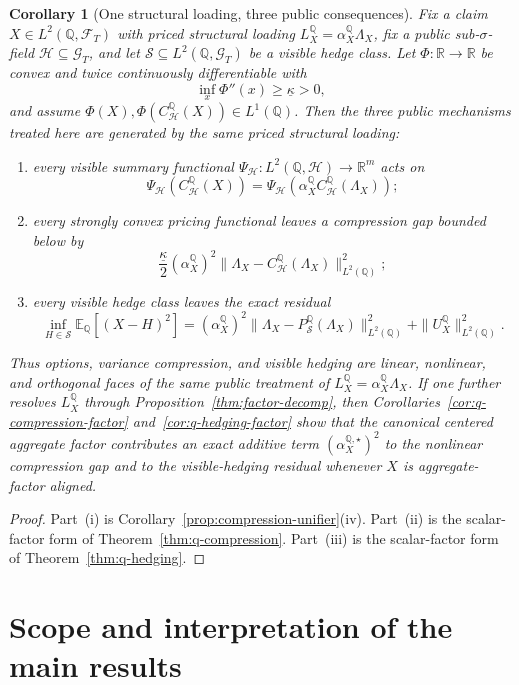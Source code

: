 \documentclass[11pt,a4paper]{amsart}
\theoremstyle{plain}
\newtheorem{corollary}[theorem]{Corollary}
\theoremstyle{definition}
\theoremstyle{remark}
\newcommand{\R}{\mathbb{R}}
\newcommand{\QQ}{\mathbb{Q}}
\newcommand{\EE}{\mathbb{E}}
\newcommand{\cF}{\mathcal{F}}
\newcommand{\cG}{\mathcal{G}}
\newcommand{\cH}{\mathcal{H}}
\newcommand{\cS}{\mathcal{S}}
\begin{document}
\begin{corollary}[One structural loading, three public consequences]\label{cor:one-mechanism}
Fix a claim \(X\in L^2(\QQ,\cF_T)\) with priced structural loading \(L_X^\QQ=\alpha_X^\QQ\Lambda_X\),
fix a public sub-\(\sigma\)-field \(\cH\subseteq \cG_T\), and let
\(\cS\subseteq L^2(\QQ,\cG_T)\) be a visible hedge class.  Let \(\Phi\colon\R\to\R\) be convex and
twice continuously differentiable with
\[
        \inf_x \Phi''(x)\ge \underline\kappa>0,
\]
and assume \(\Phi(X),\Phi(C_{\cH}^\QQ(X))\in L^1(\QQ)\).  Then the three public mechanisms treated
here are generated by the same priced structural loading:
\begin{enumerate}[label=(\roman*)]
\item every visible summary functional \(\Psi_{\cH}\colon L^2(\QQ,\cH)\to\R^m\) acts on
\[
        \Psi_{\cH}(C_{\cH}^{\QQ}(X))
        =
        \Psi_{\cH}(\alpha_X^\QQ C_{\cH}^{\QQ}(\Lambda_X));
\]
\item every strongly convex pricing functional leaves a compression gap bounded below by
\[
        \frac{\underline\kappa}{2}
        (\alpha_X^\QQ)^2
        \|\Lambda_X-C_{\cH}^{\QQ}(\Lambda_X)\|_{L^2(\QQ)}^2;
\]
\item every visible hedge class leaves the exact residual
\[
        \inf_{H\in\cS}\EE_\QQ[(X-H)^2]
        =
        (\alpha_X^\QQ)^2
        \|\Lambda_X-P_{\cS}^{\QQ}(\Lambda_X)\|_{L^2(\QQ)}^2
        +
        \|U_X^\QQ\|_{L^2(\QQ)}^2.
\]
\end{enumerate}
Thus options, variance compression, and visible hedging are linear, nonlinear, and orthogonal
faces of the same public treatment of \(L_X^\QQ=\alpha_X^\QQ\Lambda_X\).  If one further resolves
\(L_X^\QQ\) through Proposition~\ref{thm:factor-decomp}, then
Corollaries~\ref{cor:q-compression-factor} and~\ref{cor:q-hedging-factor} show that the canonical
centered aggregate factor contributes an exact additive term \((\alpha_X^{\QQ,\star})^2\) to the
nonlinear compression gap and to the visible-hedging residual whenever \(X\) is
aggregate-factor aligned.
\end{corollary}

\begin{proof}
Part~(i) is Corollary~\ref{prop:compression-unifier}(iv).  Part~(ii) is the scalar-factor form of
Theorem~\ref{thm:q-compression}.  Part~(iii) is the scalar-factor form of
Theorem~\ref{thm:q-hedging}.
\end{proof}


\section{Scope and interpretation of the main results}
\label{sec:scope-gates}
\end{document}
